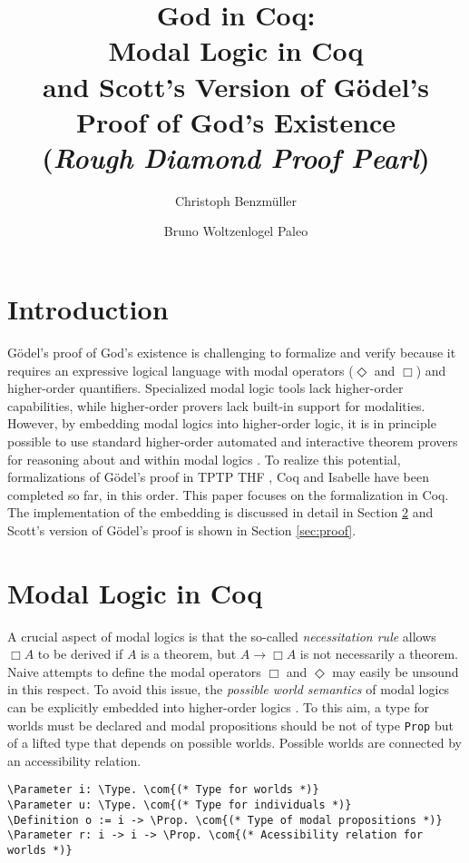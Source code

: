 \documentclass{llncs}
\title{
God in Coq: \\
Modal Logic in Coq \\ 
and Scott's Version of G\"{o}del's Proof of God's Existence \\
{\small (\emph{Rough Diamond Proof Pearl})}
}
\author{
  Christoph Benzm\"{u}ller\inst{1} 
  \and 
  Bruno Woltzenlogel Paleo\inst{2}
}
\institute{
  Dahlem Center for Intelligent Systems, Freie Universit\"{a}t Berlin, Germany\\
  \email{c.benzmueller@gmail.com}
  \and 
  Theory and Logic Group, Vienna University of Technology, Austria \\
  \email{bruno@logic.at}
}
\newcommand{\imp}{\rightarrow}
\newcommand{\red}[1]{\textcolor[rgb]{1,0,0}{#1}}
\newcommand{\blue}[1]{\textcolor[rgb]{0,0,1}{#1}}
\newcommand{\brown}[1]{\textcolor[rgb]{0.8,0.6,0.4}{#1}}
\newcommand{\Parameter}{\red{Parameter}}
\newcommand{\Definition}{\red{Definition}}
\newcommand{\Prop}{\blue{Prop}}
\newcommand{\Type}{\blue{Type}}
\newcommand{\com}[1]{\brown{#1}}
\begin{document}
\maketitle

\section{Introduction}

G\"{o}del's proof of God's existence is challenging 
to formalize and verify because it requires an 
expressive logical language with modal operators
($\Diamond$ and $\Box$) and
higher-order quantifiers. 
Specialized modal logic tools lack higher-order capabilities, 
while higher-order provers lack built-in support for modalities. 
However, by embedding modal logics into higher-order logic, 
it is in principle possible to use standard 
higher-order automated and interactive theorem provers 
for reasoning about and within modal logics \cite{J23,B9}.
To realize this potential, formalizations \cite{FormalTheologyRepository} of G\"odel's proof in TPTP THF \cite{J22}, Coq \cite{Coq} and Isabelle \cite{Isabelle} have been completed so far, in this order. This paper focuses on the formalization in Coq. The implementation of the embedding is discussed in detail in Section \ref{sec:modal} and Scott's version of G\"odel's proof is shown in Section \ref{sec:proof}.


\section{Modal Logic in Coq}
\label{sec:modal}

A crucial aspect of modal logics \cite{ToDo} is that the so-called \emph{necessitation rule} allows $\Box A$ to be derived if $A$ is a theorem, but $A \imp \Box A$ is not necessarily a theorem. Naive attempts to define the modal operators $\Box$ and $\Diamond$ may easily be unsound in this respect. To avoid this issue, the \emph{possible world semantics} of modal logics can be explicitly embedded into higher-order logics \cite{J23,B9}. To this aim, a type for worlds must be declared and modal propositions should be not of type \texttt{Prop} but of a lifted type that depends on possible worlds. Possible worlds are connected by an accessibility relation.

\begin{Verbatim}[commandchars=\\\{\}]
\Parameter i: \Type. \com{(* Type for worlds *)}
\Parameter u: \Type. \com{(* Type for individuals *)}
\Definition o := i -> \Prop. \com{(* Type of modal propositions *)}
\Parameter r: i -> i -> \Prop. \com{(* Acessibility relation for worlds *)}
\end{Verbatim}
\end{document}
